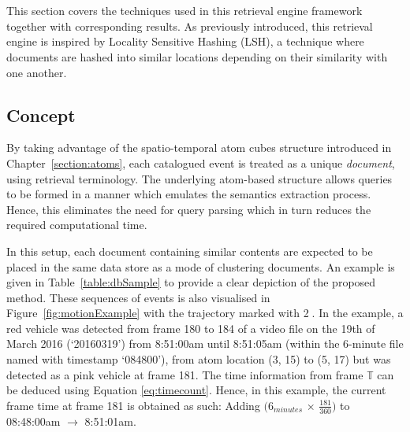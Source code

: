 \section{\versionOneRet}
\label{section:versionOne}
This section covers the techniques used in this retrieval engine
framework together with corresponding results. As previously introduced, this retrieval engine is inspired by Locality Sensitive Hashing (LSH), a technique where documents are hashed into similar locations depending on their similarity with one another. 

\subsection{Concept}
\label{versionOneConcept}
By taking advantage of the spatio-temporal atom cubes structure introduced in
Chapter~\ref{section:atoms}, each catalogued event %
is treated as a
unique \emph{document}, using retrieval terminology. The underlying atom-based structure allows queries to be formed in a manner which emulates the semantics extraction process. Hence, this eliminates the need for query parsing which in turn reduces the required computational time.

In this setup, each document containing similar contents are expected to be placed in the same data store as a mode of clustering documents. An example is given in
Table~\ref{table:dbSample} to provide a clear depiction of the proposed
method. These sequences of events is also visualised in
Figure~\ref{fig:motionExample} with the trajectory marked with \textcircled{2}.
In the example, a red vehicle was detected from frame 180 to 184 of a video file on the 19th of March 2016 (`20160319') from 8:51:00am until 8:51:05am (within the 6-minute file named with timestamp `084800'), from atom location (3, 15)
to (5, 17) but was detected as a pink vehicle at frame 181.
The time information from frame $\mathbb{T}$ can be deduced using Equation \ref{eq:timecount}.
Hence, in this example, the
current frame time at frame 181 is obtained as such: Adding $(6_{minutes}$ $\times$ $\frac{181}{360})$ to 08:48:00am $\rightarrow$ 8:51:01am.

